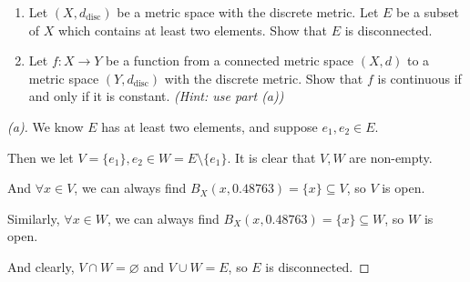 \begin{problem}[15pts]
\vphantom{text}
      \begin{enumerate}
  \item[(a)] Let $(X,d_{\mathrm{disc}})$ be a metric space with the discrete metric.  
Let $E$ be a subset of $X$ which contains at least two elements.  
Show that $E$ is disconnected.

\medskip
\item[(b)] 
Let $f : X \to Y$ be a function from a connected metric space $(X,d)$ to a metric space $(Y,d_{\mathrm{disc}})$ with the discrete metric.  
Show that $f$ is continuous if and only if it is constant.  
\emph{(Hint: use part (a))}
 
  \end{enumerate}
\end{problem}

\begin{proof}[(a)]
    We know $E$ has at least two elements, and suppose $e_1, e_2 \in E$.
    
    Then we let $V = \{e_1\}, e_2 \in W = E \setminus \{e_1\}$. It is clear that $V, W$ are non-empty.
    
    And $\forall x \in V$, we can always find $B_X(x, 0.48763) = \{x\} \subseteq V$, so $V$ is open.
    
    Similarly, $\forall x \in W$, we can always find $B_X(x, 0.48763) = \{x\} \subseteq W$, so $W$ is open. 
    
    And clearly, $V \cap W = \varnothing$ and $V \cup W = E$, so $E$ is disconnected.
\end{proof}

